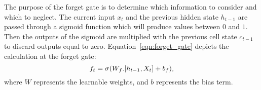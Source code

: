 The purpose of the forget gate is to determine which information to consider and which to neglect.
The current input \(x_t\) and the previous hidden state \(h_{t-1}\) are passed through a sigmoid function which will produce values between \(0\) and \(1\).
Then the outputs of the sigmoid are multiplied with the previous cell state \(c_{t-1}\) to discard outputs equal to zero.
Equation~\ref{eqn:forget_gate} depicts the calculation at the forget gate:
\begin{equation}
	\centering
	f_t = \sigma(W_f.[h_{t-1}, X_{t}]+ b_f),
	\label{eqn:forget_gate}
\end{equation}
where \(W\) represents the learnable weights, and \(b\) represents the bias term.

